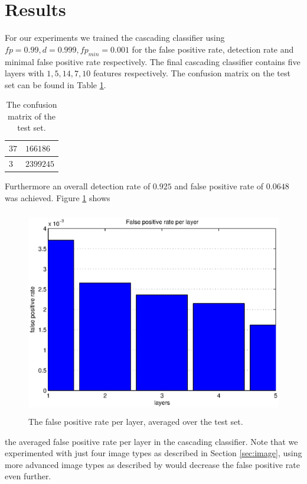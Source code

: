 \documentclass[a4paper,11pt]{article}
\begin{document}
\section{Results} \label{sec:res}
For our experiments we trained the cascading classifier using $fp = 0.99, d =
0.999, fp_{min} = 0.001$ for the false positive rate, detection rate and
minimal false positive rate respectively. The final cascading classifier
contains five layers with $1, 5, 14, 7, 10$ features respectively. The
confusion matrix on the test set can be found in Table \ref{tab:conf}. 
\begin{table}[!ht]
\centering
\begin{tabular}{|l|l|}
\hline
$37$ & $166186$ \\
\hline
$3$  & $2399245$ \\
\hline
\end{tabular}
\caption{The confusion matrix of the test set.}
\label{tab:conf}
\end{table}
Furthermore an overall detection rate of $0.925$ and false positive rate of
$0.0648$ was achieved. Figure \ref{fig:fprate} shows
\begin{figure}[!ht]
\centering
\includegraphics[height=9cm]{img/fprate}
\caption{The false positive rate per layer, averaged over the test set.}
\label{fig:fprate}
\end{figure}
the averaged false positive rate per layer in the cascading classifier. Note
that we experimented with just four image types as described in Section
\ref{sec:image}, using more advanced image types as described by \cite{naturaltext}
would decrease the false positive rate even further.
\end{document}
